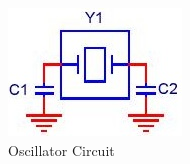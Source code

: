 \begin{figure}[ht!]
\includegraphics[keepaspectratio=true,scale=.5]{./figures/parameters/oscillator.jpg}
\centering
\caption{Oscillator Circuit}
\label{fig:oscillator}
\end{figure}
